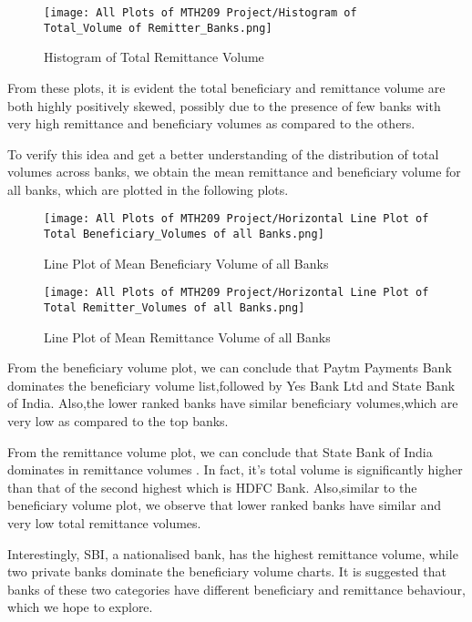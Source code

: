 \documentclass{article}
\begin{document}
\begin{figure}[H]
    \centering
    \texttt{[image: All Plots of MTH209 Project/Histogram of Total\_Volume of Remitter\_Banks.png]}
    \caption{Histogram of Total Remittance Volume}
    \label{fig:example}
\end{figure}

From these plots, it is evident the total beneficiary and remittance volume are both highly positively skewed, possibly due to the presence of few banks with very high remittance and beneficiary volumes as compared to the others.

To verify this idea and get a better understanding of the distribution of total volumes across banks, we obtain the mean remittance and beneficiary volume for all banks, which are plotted in the following plots.

\begin{figure}[H]
 \centering
 \texttt{[image: All Plots of MTH209 Project/Horizontal Line Plot of Total Beneficiary\_Volumes of all Banks.png]}
    \caption{Line Plot of Mean Beneficiary Volume of all Banks}
    \label{fig:example}
\end{figure}

\begin{figure}[H]
    \centering
    \texttt{[image: All Plots of MTH209 Project/Horizontal Line Plot of Total Remitter\_Volumes of all Banks.png]}
    \caption{Line Plot of Mean Remittance Volume of all Banks}
    \label{fig:example}
\end{figure}

 From the beneficiary volume plot, we can conclude that Paytm Payments Bank dominates the beneficiary volume list,followed by Yes Bank Ltd and State Bank of India. Also,the lower ranked banks have similar beneficiary volumes,which are very low as compared to the top banks.

From the remittance volume plot, we can conclude that State Bank of India dominates in remittance volumes . In fact, it's total volume is significantly higher than that of the second highest which is HDFC Bank. Also,similar to the beneficiary volume plot, we observe that lower ranked  banks have similar and very low total remittance volumes.

Interestingly, SBI, a nationalised bank, has the highest remittance volume, while two private banks dominate the beneficiary volume charts. It is suggested that banks of these two categories have different beneficiary and remittance behaviour, which we hope to explore.
\newpage
\end{document}
